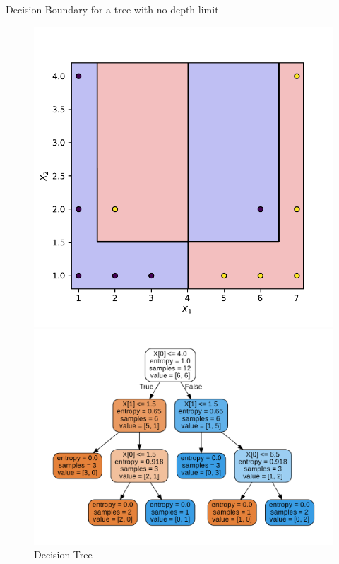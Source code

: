 \documentclass{beamer}
\begin{document}
	\begin{frame}{Decision Boundary for a tree with no depth limit}
	\begin{figure}[h]
	    \centering
	    \begin{minipage}{0.45\textwidth}
	        \centering
	        \includegraphics[width=\textwidth]{example-1-nolimit-boundary}
	        \caption{Decision Boundary}
	    \end{minipage}
	    \hfill
	    \begin{minipage}{0.45\textwidth}
	        \centering
	        \includegraphics[width=\textwidth]{example-1-nolimit-decision-tree}
	        \caption{Decision Tree}
	    \end{minipage}
	\end{figure}
	\end{frame}
	
\end{document}
